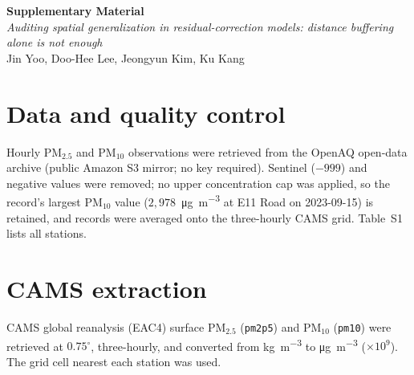 \documentclass[11pt]{article}
\newcommand*{\pmten}{\ensuremath{\mathrm{PM_{10}}}}
\begin{document}
\begin{center}
{\large\bfseries Supplementary Material}\\[6pt]
{\itshape Auditing spatial generalization in residual-correction models:
distance buffering alone is not enough}\\[4pt]
Jin Yoo, Doo-Hee Lee, Jeongyun Kim, Ku Kang\\
\end{center}
\vspace{1em}

\section{Data and quality control}
Hourly PM$_{2.5}$ and PM$_{10}$ observations were retrieved from the OpenAQ open-data archive (public Amazon S3 mirror; no key required). Sentinel ($-999$) and negative values were removed; no upper concentration cap was applied, so the record's largest \pmten{} value ($2{,}978$~\si{\micro\gram\per\cubic\metre} at E11 Road on 2023-09-15) is retained, and records were averaged onto the three-hourly CAMS grid. Table~S1 lists all stations.

\section{CAMS extraction}
CAMS global reanalysis (EAC4) surface PM$_{2.5}$ (\texttt{pm2p5}) and PM$_{10}$ (\texttt{pm10}) were retrieved at $0.75^\circ$, three-hourly, and converted from \si{\kilo\gram\per\cubic\metre} to \si{\micro\gram\per\cubic\metre} ($\times10^{9}$). The grid cell nearest each station was used.
\end{document}
